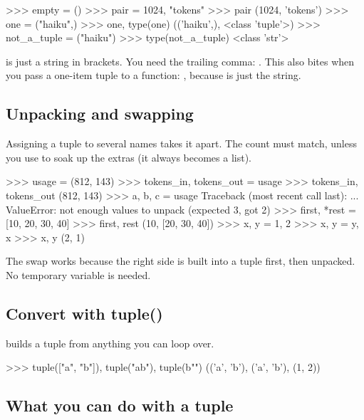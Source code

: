 \begin{pycode}
>>> empty = ()
>>> pair = 1024, "tokens"
>>> pair
(1024, 'tokens')
>>> one = ("haiku",)
>>> one, type(one)
(('haiku',), <class 'tuple'>)
>>> not_a_tuple = ("haiku")
>>> type(not_a_tuple)
<class 'str'>
\end{pycode}

\begin{trap}
 is just a string in brackets. You need the trailing comma: . This also
bites when you pass a one-item tuple to a function: , because  is just the
string.
\end{trap}

\subsection{Unpacking and swapping}

Assigning a tuple to several names takes it apart. The count must match, unless you use  to
soak up the extras (it always becomes a list).

\begin{pycode}
>>> usage = (812, 143)
>>> tokens_in, tokens_out = usage
>>> tokens_in, tokens_out
(812, 143)
>>> a, b, c = usage
Traceback (most recent call last):
  ...
ValueError: not enough values to unpack (expected 3, got 2)
>>> first, *rest = [10, 20, 30, 40]
>>> first, rest
(10, [20, 30, 40])
>>> x, y = 1, 2
>>> x, y = y, x
>>> x, y
(2, 1)
\end{pycode}

The swap works because the right side is built into a tuple first, then unpacked. No temporary variable is
needed.

\subsection{Convert with tuple()}

 builds a tuple from anything you can loop over.

\begin{pycode}
>>> tuple(["a", "b"]), tuple("ab"), tuple(b"")
(('a', 'b'), ('a', 'b'), (1, 2))
\end{pycode}

\subsection{What you can do with a tuple}

